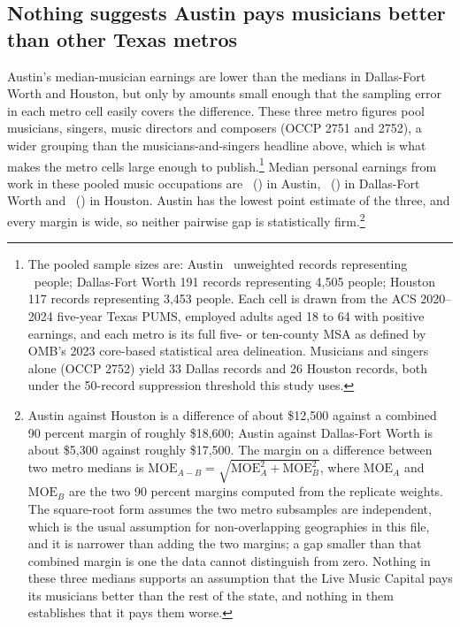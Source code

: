 \subsection{Nothing suggests Austin pays musicians better than other Texas metros}

Austin's median-musician earnings are lower than the medians in Dallas-Fort
Worth and Houston, but only by amounts small enough that the sampling error
in each metro cell easily covers the difference. These three metro figures
pool musicians, singers, music directors and composers (OCCP 2751 and 2752),
a wider grouping than the musicians-and-singers headline above, which is
what makes the metro cells large enough to publish.\footnote{The pooled
sample sizes are: Austin \NPumsMetroAustinMusicN\ unweighted records
representing \NPumsMetroAustinMusicWtd\ people; Dallas-Fort Worth 191 records
representing 4,505 people; Houston 117 records representing 3,453 people.
Each cell is drawn from the ACS 2020--2024 five-year Texas PUMS, employed
adults aged 18 to 64 with positive earnings, and each metro is its full
five- or ten-county MSA as defined by OMB's 2023 core-based statistical area
delineation. Musicians and singers alone (OCCP 2752) yield 33 Dallas records
and 26 Houston records, both under the 50-record suppression threshold this
study uses.} Median personal earnings from work in these pooled music
occupations are \NPumsMetroAustinMusicMedpernp\
(\NPumsMetroAustinMusicMedpernpMoe) in Austin,
\NPumsMetroDfwMusicMedpernp\ (\NPumsMetroDfwMusicMedpernpMoe) in Dallas-Fort
Worth and \NPumsMetroHoustonMusicMedpernp\
(\NPumsMetroHoustonMusicMedpernpMoe) in Houston. Austin has the lowest point
estimate of the three, and every margin is wide, so neither pairwise gap is
statistically firm.\footnote{Austin against Houston is a difference of about
\$12,500 against a combined 90 percent margin of roughly \$18,600; Austin
against Dallas-Fort Worth is about \$5,300 against roughly \$17,500. The
margin on a difference between two metro medians is
\(\mathrm{MOE}_{A-B} = \sqrt{\mathrm{MOE}_A^{2} + \mathrm{MOE}_B^{2}}\),
where \(\mathrm{MOE}_A\) and \(\mathrm{MOE}_B\) are the two 90 percent
margins computed from the replicate weights. The square-root form assumes
the two metro subsamples are independent, which is the usual assumption for
non-overlapping geographies in this file, and it is narrower than adding the
two margins; a gap smaller than that combined margin is one the data cannot
distinguish from zero. Nothing in these three medians supports an assumption
that the Live Music Capital pays its musicians better than the rest of the
state, and nothing in them establishes that it pays them worse.}

